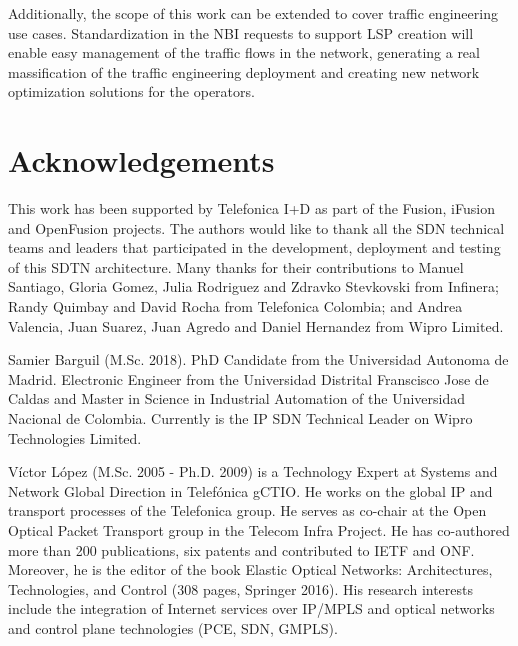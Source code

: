 \documentclass[a4paper,fleqn]{cas-dc}
\begin{document}
Additionally, the scope of this work can be extended to cover traffic engineering use cases. Standardization in the NBI requests to support LSP creation will enable easy management of the traffic flows in the network, generating a real massification of the traffic engineering deployment and creating new network optimization solutions for the operators.

\printcredits

\section*{Acknowledgements}
This work has been supported by Telefonica I+D as part of the Fusion, iFusion and OpenFusion projects. The authors would like to thank all the SDN technical teams and leaders that participated in the development, deployment and testing of this SDTN architecture. Many thanks for their contributions to Manuel Santiago, Gloria Gomez, Julia Rodriguez and Zdravko Stevkovski from Infinera; Randy Quimbay and David Rocha from Telefonica Colombia; and Andrea Valencia, Juan Suarez, Juan Agredo and Daniel Hernandez from Wipro Limited.   


%
%






Samier Barguil (M.Sc. 2018). PhD Candidate from the Universidad Autonoma de Madrid. Electronic Engineer from the Universidad Distrital Franscisco Jose de Caldas and Master in Science in Industrial Automation of the Universidad Nacional de Colombia. Currently is the IP SDN Technical Leader on Wipro Technologies Limited. 
\endbio

Víctor López (M.Sc. 2005 - Ph.D. 2009) is a Technology Expert at Systems and Network Global Direction in Telefónica gCTIO. He works on the global IP and transport processes of the Telefonica group. He serves as co-chair at the Open Optical Packet Transport group in the Telecom Infra Project. He has co-authored more than 200 publications, six patents and contributed to IETF and ONF. Moreover, he is the editor of the book Elastic Optical Networks: Architectures, Technologies, and Control (308 pages, Springer 2016). His research interests include the integration of Internet services over IP/MPLS and optical networks and control plane technologies (PCE, SDN, GMPLS).
\endbio
\end{document}
